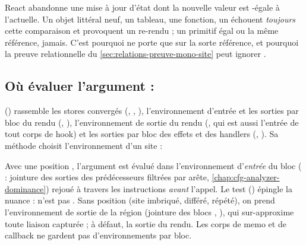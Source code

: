 \begin{react}
React abandonne une mise à jour d'état dont la nouvelle valeur est -égale à l'actuelle. Un objet littéral neuf, un tableau, une fonction, un  échouent \emph{toujours} cette comparaison et provoquent un re-rendu ; un primitif égal ou la même référence, jamais. C'est pourquoi  ne porte que sur la sorte référence, et pourquoi la preuve relationnelle du \cref{sec:relations-preuve-mono-site} peut ignorer .
\end{react}

\subsection{Où évaluer l'argument : }

 () rassemble les stores convergés (, , ), l'environnement d'entrée et les sorties par bloc du rendu (, ), l'environnement de sortie du rendu (, qui est aussi l'entrée de tout corps de hook) et les sorties par bloc des effets et des handlers (, ). Sa méthode  choisit l'environnement d'un site :


Avec une position , l'argument est évalué dans l'environnement d'\emph{entrée} du bloc ( : jointure des sorties des prédécesseurs filtrées par arête, \cref{chap:cfg-analyzer-dominance}) rejoué à travers les instructions \emph{avant} l'appel. Le test  () épingle la nuance :  n'est pas . Sans position (site imbriqué, différé, répété), on prend l'environnement de sortie de la région (jointure des blocs , ), qui sur-approxime toute liaison capturée ; à défaut, la sortie du rendu. Les corps de memo et de callback ne gardent pas d'environnements par bloc.

